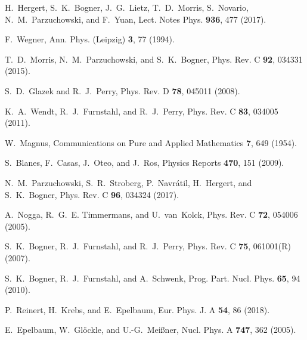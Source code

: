 \documentclass[preprintnumbers,floatfix,aps,prc,preprint]{revtex4-1}
\begin{document}
\begin{thebibliography}{99}

H.~Hergert, S.~K.~Bogner, J.~G.~Lietz, T.~D.~Morris, S.~Novario, N.~M.~Parzuchowski, and F.~Yuan,
Lect. Notes Phys. {\bf 936}, 477 (2017).

F.~Wegner,
Ann. Phys. (Leipzig) {\bf 3}, 77 (1994).

T.~D.~Morris, N.~M.~Parzuchowski, and S.~K.~Bogner,
Phys. Rev. C {\bf 92}, 034331 (2015).

S.~D.~Glazek and R.~J.~Perry,
Phys. Rev. D {\bf 78}, 045011 (2008).

K.~A.~Wendt, R.~J.~Furnstahl, and R.~J.~Perry,
Phys. Rev. C {\bf 83}, 034005 (2011).

W.~Magnus,
Communications on Pure and Applied Mathematics {\bf 7}, 649 (1954).

S.~Blanes, F.~Casas, J.~Oteo, and J.~Ros,
Physics Reports {\bf 470}, 151 (2009).

N.~M.~Parzuchowski, S.~R.~Stroberg, P.~Navr{\'a}til, H.~Hergert, and S.~K.~Bogner,
Phys. Rev. C {\bf 96}, 034324 (2017).

A.~Nogga, R.~G.~E. Timmermans, and U.~van~Kolck,
Phys. Rev. C {\bf 72}, 054006 (2005).

S.~K.~Bogner, R.~J.~Furnstahl, and R.~J.~Perry,
Phys. Rev. C {\bf 75}, 061001(R) (2007).

S.~K.~Bogner, R.~J.~Furnstahl, and A.~Schwenk,
Prog. Part. Nucl. Phys. {\bf 65}, 94 (2010).

P.~Reinert, H.~Krebs, and E.~Epelbaum,
Eur. Phys. J. A {\bf 54}, 86 (2018).

E.~Epelbaum, W.~Gl{\"o}ckle, and U.-G.~Mei{\ss}ner,
Nucl. Phys. A {\bf 747}, 362 (2005).

\end{thebibliography}
\end{document}
